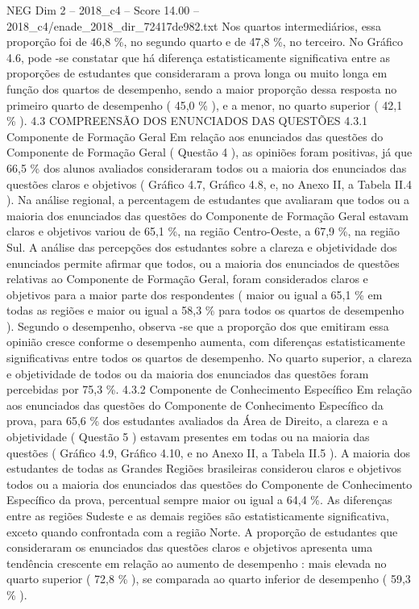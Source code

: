 \begin{textsample}{NEG Dim 2 – 2018\_c4 – Score 14.00 – 2018\_c4/enade\_2018\_dir\_72417de982.txt}
Nos quartos intermediários, essa proporção foi de 46,8 \%, no segundo quarto e de 47,8 \%, no terceiro.
No Gráfico 4.6, pode -se constatar que há diferença estatisticamente significativa entre as proporções de estudantes que consideraram a prova longa ou muito longa em função dos quartos de desempenho, sendo a maior proporção dessa resposta no primeiro quarto de desempenho ( 45,0 \% ), e a menor, no quarto superior ( 42,1 \% ). 4.3 COMPREENSÃO DOS ENUNCIADOS DAS QUESTÕES 4.3.1 Componente de Formação Geral Em relação aos enunciados das questões do Componente de Formação Geral ( Questão 4 ), as opiniões foram positivas, já que 66,5 \% dos alunos avaliados consideraram todos ou a maioria dos enunciados das questões claros e objetivos ( Gráfico 4.7, Gráfico 4.8, e, no Anexo II, a Tabela II.4 ).
Na análise regional, a percentagem de estudantes que avaliaram que todos ou a maioria dos enunciados das questões do Componente de Formação Geral estavam claros e objetivos variou de 65,1 \%, na região Centro-Oeste, a 67,9 \%, na região Sul.
A análise das percepções dos estudantes sobre a clareza e objetividade dos enunciados permite afirmar que todos, ou a maioria dos enunciados de questões relativas ao Componente de Formação Geral, foram considerados claros e objetivos para a maior parte dos respondentes ( maior ou igual a 65,1 \% em todas as regiões e maior ou igual a 58,3 \% para todos os quartos de desempenho ).
Segundo o desempenho, observa -se que a proporção dos que emitiram essa opinião cresce conforme o desempenho aumenta, com diferenças estatisticamente significativas entre todos os quartos de desempenho.
No quarto superior, a clareza e objetividade de todos ou da maioria dos enunciados das questões foram percebidas por 75,3 \%. 4.3.2 Componente de Conhecimento Específico Em relação aos enunciados das questões do Componente de Conhecimento Específico da prova, para 65,6 \% dos estudantes avaliados da Área de Direito, a clareza e a objetividade ( Questão 5 ) estavam presentes em todas ou na maioria das questões ( Gráfico 4.9, Gráfico 4.10, e no Anexo II, a Tabela II.5 ).
A maioria dos estudantes de todas as Grandes Regiões brasileiras considerou claros e objetivos todos ou a maioria dos enunciados das questões do Componente de Conhecimento Específico da prova, percentual sempre maior ou igual a 64,4 \%.
As diferenças entre as regiões Sudeste e as demais regiões são estatisticamente significativa, exceto quando confrontada com a região Norte.
A proporção de estudantes que consideraram os enunciados das questões claros e objetivos apresenta uma tendência crescente em relação ao aumento de desempenho : mais elevada no quarto superior ( 72,8 \% ), se comparada ao quarto inferior de desempenho ( 59,3 \% ).

\end{textsample}
